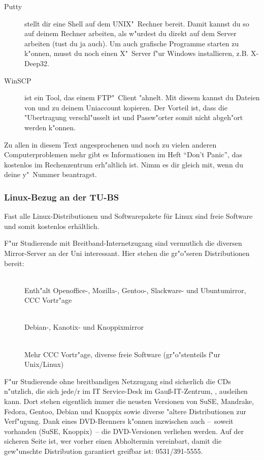 \begin{description}
\item[Putty] stellt dir eine Shell auf dem UNIX"~Rechner bereit. Damit
kannst du so auf deinem Rechner arbeiten, als w"urdest du direkt auf
dem Server arbeiten (tust du ja auch). Um auch grafische Programme
starten zu k"onnen, musst du noch einen X"~Server f"ur Windows installieren,
z.B. X-Deep32.
\item[WinSCP] ist ein Tool, das einem FTP"~Client "ahnelt. Mit diesem
kannst du Dateien von und zu deinem Uniaccount kopieren. Der Vorteil
ist, dass die "Ubertragung verschl"usselt ist und Passw"orter somit
nicht abgeh"ort werden k"onnen.
\end{description}

Zu allen in diesem Text angesprochenen und noch zu vielen anderen
Computerproblemen mehr gibt es Informationen im Heft "`Don't Panic"',
das kostenlos im Rechenzentrum erh"altlich ist. Nimm es dir gleich mit, wenn
du deine y"~Nummer beantragst.

\subsubsection{Linux-Bezug an der TU-BS}
Fast alle Linux-Distributionen und Softwarepakete für Linux sind freie
Software und somit kostenlos erhältlich.

F"ur Studierende mit Breitband-Internetzugang sind vermutlich die diversen 
Mirror-Server an der Uni interessant. Hier stehen die gr"o"seren 
Distributionen bereit:
	  
\begin{description}
\item[]~\\Enth"alt Openoffice-, Mozilla-,
Gentoo-, Slackware- und Ubuntumirror, CCC Vortr"age
\item[]~\\Debian-, Kanotix- und Knoppixmirror
\item[]~\\Mehr CCC Vortr"age, diverse freie
Software (gr"o"stenteils f"ur Unix/Linux)
\end{description}

F"ur Studierende ohne breitbandigen Netzzugang sind sicherlich die CDs 
n"utzlich, die sich jede/r im
IT Service-Desk
im Gauß-IT-Zentrum, , ausleihen kann. Dort stehen eigentlich
immer die neusten Versionen von SuSE, Mandrake, Fedora, Gentoo, Debian und Knoppix
sowie diverse "altere Distributionen zur Verf"ugung. Dank eines DVD-Brenners
k"onnen inzwischen auch --~soweit vorhanden (SuSE, Knoppix)~-- die
DVD-Versionen verliehen werden. Auf der sicheren Seite ist, wer vorher einen
Abholtermin vereinbart, damit die gew"unschte Distribution garantiert greifbar
ist: 0531/391-5555.
